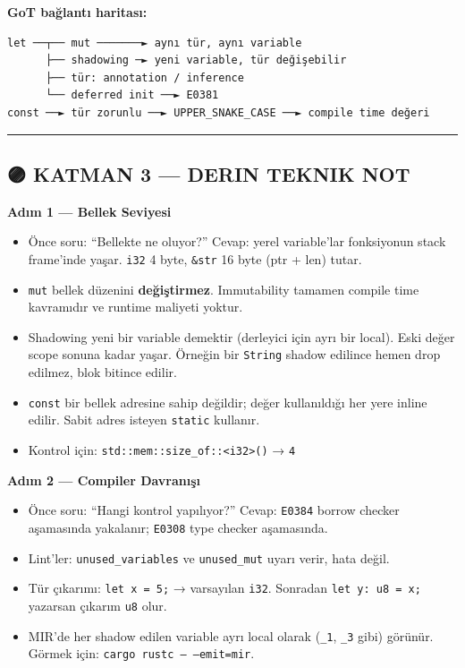 \documentclass[12pt,a4paper]{article}
\begin{document}
\textbf{GoT bağlantı haritası:}

\begin{verbatim}
let ──┬── mut ───────► aynı tür, aynı variable
      ├── shadowing ─► yeni variable, tür değişebilir
      ├── tür: annotation / inference
      └── deferred init ──► E0381
const ──► tür zorunlu ──► UPPER_SNAKE_CASE ──► compile time değeri
\end{verbatim}

\begin{center}\rule{0.5\linewidth}{0.5pt}\end{center}

\subsection{🟣 KATMAN 3 --- DERIN TEKNIK NOT}\label{katman-3-—-derin-teknik-not-2}

\textbf{Adım 1 --- Bellek Seviyesi}

\begin{itemize}
\tightlist
\item
  Önce soru: ``Bellekte ne oluyor?'' Cevap: yerel variable'lar fonksiyonun stack frame'inde yaşar. \texttt{i32} 4 byte, \texttt{\&str} 16 byte (ptr + len) tutar.
\item
  \texttt{mut} bellek düzenini \textbf{değiştirmez}. Immutability tamamen compile time kavramıdır ve runtime maliyeti yoktur.
\item
  Shadowing yeni bir variable demektir (derleyici için ayrı bir local). Eski değer scope sonuna kadar yaşar. Örneğin bir \texttt{String} shadow edilince hemen drop edilmez, blok bitince edilir.
\item
  \texttt{const} bir bellek adresine sahip değildir; değer kullanıldığı her yere inline edilir. Sabit adres isteyen \texttt{static} kullanır.
\item
  Kontrol için: \texttt{std::mem::size\_of::\textless{}i32\textgreater{}()} → \texttt{4}
\end{itemize}

\textbf{Adım 2 --- Compiler Davranışı}

\begin{itemize}
\tightlist
\item
  Önce soru: ``Hangi kontrol yapılıyor?'' Cevap: \texttt{E0384} borrow checker aşamasında yakalanır; \texttt{E0308} type checker aşamasında.
\item
  Lint'ler: \texttt{unused\_variables} ve \texttt{unused\_mut} uyarı verir, hata değil.
\item
  Tür çıkarımı: \texttt{let\ x\ =\ 5;} → varsayılan \texttt{i32}. Sonradan \texttt{let\ y:\ u8\ =\ x;} yazarsan çıkarım \texttt{u8} olur.
\item
  MIR'de her shadow edilen variable ayrı local olarak (\texttt{\_1}, \texttt{\_3} gibi) görünür. Görmek için: \texttt{cargo\ rustc\ --\ --emit=mir}.
\end{itemize}
\end{document}
